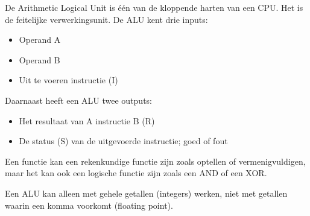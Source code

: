 De Arithmetic Logical Unit is \'e\'en van de kloppende harten van een CPU. Het is de feitelijke verwerkingsunit. De ALU kent drie inputs:
\begin{itemize}
\item Operand A
\item Operand B
\item Uit te voeren instructie (I)
\end{itemize}
Daarnaast heeft een ALU twee outputs:
\begin{itemize}
\item Het resultaat van A instructie B (R)
\item De status (S) van de uitgevoerde instructie; goed of fout
\end{itemize}
Een functie kan een rekenkundige functie zijn zoals optellen of vermenigvuldigen, maar het kan ook een logische functie zijn zoals een AND of een XOR.

Een ALU kan alleen met gehele getallen (integers) werken, niet met getallen waarin een komma voorkomt (floating point).


